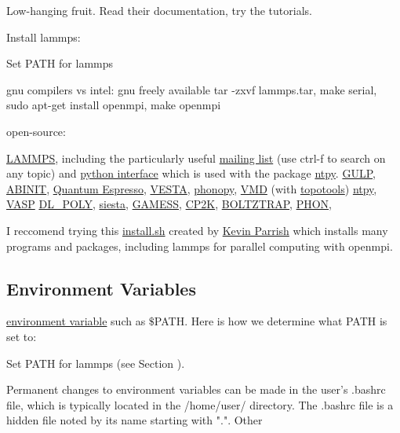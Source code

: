 Low-hanging fruit.  Read their documentation, try the tutorials. 

Install lammps:

Set PATH for lammps

gnu compilers vs intel: gnu freely available
tar -zxvf lammps.tar, make serial, sudo apt-get install openmpi, make openmpi

open-source: 

\href{http://lammps.sandia.gov/}{LAMMPS}, including the particularly 
useful 
\href{http://lammps.sandia.gov/threads/threads.html}{mailing list} 
(use ctrl-f to search on any topic)  
and
\href{http://lammps.sandia.gov/doc/Section_python.html}
{python interface} which is used with the package 
\href{http://github.com/ntpl/ntpy}{ntpy}. 
\href{http://projects.ivec.org/gulp/}{GULP}, 
\href{http://www.abinit.org/}{ABINIT}, 
\href{http://www.quantum-espresso.org/}{Quantum Espresso}, 
\href{http://jp-minerals.org/vesta/en/}{VESTA}, 
\href{http://phonopy.sourceforge.net/}{phonopy}, 
\href{http://www.ks.uiuc.edu/Research/vmd/}{VMD} 
(with 
\href{https://sites.google.com/site/akohlmey/software/topotools}
{topotools})
\href{http://github.com/ntpl/ntpy}{ntpy},
\href{https://www.vasp.at/}{VASP}
\href{http://www.stfc.ac.uk/CSE/randd/ccg/software/DL_POLY/25526.aspx}
{DL_POLY}, 
\href{http://icmab.cat/leem/siesta/}
{siesta}, 
\href{http://www.msg.ameslab.gov/gamess/}{GAMESS}, 
\href{http://www.cp2k.org/}{CP2K}, 
\href{http://www.icams.de/content/departments/ams/madsen/boltztrap.html}{BOLTZTRAP}, 
\href{http://www.homepages.ucl.ac.uk/~ucfbdxa/phon/}{PHON}, 

I reccomend trying this 
\href{}{install.sh} created by 
\href{http://www.github.com/kparrish}{Kevin Parrish} which installs 
many programs and packages, including lammps for parallel computing 
with openmpi.

\subsection{Environment Variables}

\href{http://en.wikipedia.org/wiki/Environment_variable}
{environment variable} such as $\$$PATH.  Here is how we determine what 
PATH is set to:


Set PATH for lammps (see Section ).


Permanent changes to environment variables can be made in the user's 
.bashrc file, which is typically located in the /home/user/ directory. 
The .bashrc file is a hidden file noted by its name starting with ".". 
Other

